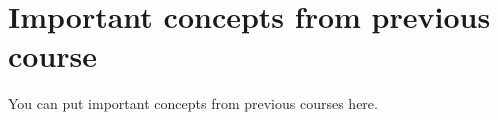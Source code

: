 \documentclass[../notes.tex]{subfile}
\begin{document}
\chapter{Important concepts from previous course}

You can put important concepts from previous courses here.
\end{document}
